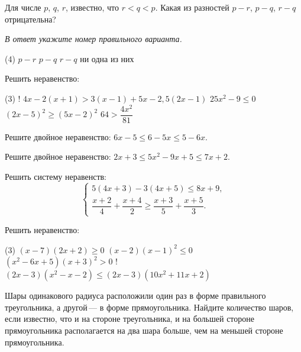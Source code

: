 %
%
\begin{class}[number=6]
	\begin{listofex}
		\item Для числе \( p \), \( q \), \( r \), известно, что \( r<q<p \). Какая из разностей \( p-r \), \( p-q \), \( r-q \) отрицательна?
		
		\textit{В ответ укажите номер правильного варианта.}
		\begin{tasks}(4)
			\task \( p-r \)
			\task \( p-q \)
			\task \( r-q \)
			\task ни одна из них
		\end{tasks}
		\item Решить неравенство:
		\begin{tasks}(3)
			\task! \( 4x-2(x+1)>3(x-1)+5x-2,5(2x-1) \)
			\task \( 25x^2-9\le0 \)
			\task \( (2x-5)^2\ge(5x-2)^2 \)
			\task \( 64>\dfrac{4x^2}{81} \)
		\end{tasks}
		\item Решите двойное неравенство: \( 6x-5\le6-5x\le5-6x \).
		\item Решите двойное неравенство: \( 2x+3\le5x^2-9x+5\le7x+2 \).
		\item Решить систему неравенств:
		\[ \left\{
		\begin{array}{l}
			5(4x+3)-3(4x+5)\le8x+9,\\
			\dfrac{x+2}{4}+\dfrac{x+4}{2}\ge\dfrac{x+3}{5}+\dfrac{x+5}{3}.
		\end{array}
		\right. \]
		\item Решить неравенство:
		\begin{tasks}(3)
			\task \( (x-7)(2x+2)\ge0 \)
			\task \( (x-2)(x-1)^2\le0 \)
			\task \( (x^2-6x+5)(x+3)^2>0 \)
			\task! \( (2x-3)(x^2-x-2)\le(2x-3)(10x^2+11x+2) \)
		\end{tasks}
		\item Шары одинакового радиуса расположили один раз в форме правильного треугольника,
		а другой --- в форме прямоугольника. Найдите количество шаров,
		если известно, что и на стороне треугольника,
		и на большей стороне прямоугольника располагается на два шара больше,
		чем на меньшей стороне прямоугольника.
	\end{listofex}
\end{class}
%
%
%
%	
%
%
%	
%
%
%	
